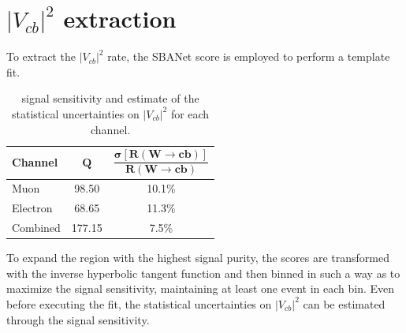 \section{$|V_{cb}|^2$ extraction}
To extract the $|V_{cb}|^2$ rate, the SBANet score is employed to perform a template fit.

\begin{minipage}{\linewidth}
\begin{minipage}{0.43\linewidth}
\begin{table}[H]
    \centering
    \begin{tabular}{l|cc}
    \toprule
        \textbf{Channel} & $\bm{Q}$ & $\dfrac{\bm{\sigma[R(W \to cb)]}}{\bm{R(W \to cb)}}$ \\
        \midrule
         Muon & 98.50 & 10.1\%\\
         Electron & 68.65 &  11.3\%\\
         Combined & 177.15 & 7.5\%\\
         \bottomrule
    \end{tabular}
    \caption{signal sensitivity and estimate of the statistical uncertainties on $|V_{cb}|^2$ for each channel.}
    \label{tab:stat_unc}
\end{table}
    
\end{minipage}
\hfill
\begin{minipage}{0.52\linewidth}
    To expand the region with the highest signal purity, the scores are transformed with the inverse hyperbolic tangent function and then binned in such a way as to maximize the signal sensitivity, maintaining at least one event in each bin.
    Even before executing the fit, the statistical uncertainties on $|V_{cb}|^2$ can be estimated through the signal sensitivity.
\end{minipage}

    
\end{minipage}

